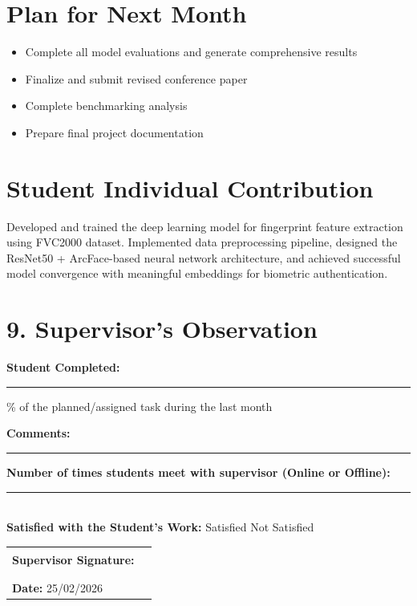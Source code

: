 \documentclass[12pt,a4paper]{article}
\begin{document}
\section{Plan for Next Month}
\begin{itemize}[leftmargin=*]
    \item Complete all model evaluations and generate comprehensive results
    \item Finalize and submit revised conference paper
    \item Complete benchmarking analysis
    \item Prepare final project documentation
\end{itemize}


\section{Student Individual Contribution}
Developed and trained the deep learning model for fingerprint feature extraction using FVC2000 dataset. Implemented data preprocessing pipeline, designed the ResNet50 + ArcFace-based neural network architecture, and achieved successful model convergence with meaningful embeddings for biometric authentication.

\section*{9. Supervisor's Observation}

\noindent\textbf{Student Completed:} \rule{3cm}{0.4pt}\% 
of the planned/assigned task during the last month

\vspace{0.5cm}

\noindent\textbf{Comments:}

\vspace{2cm}
\noindent\rule{\textwidth}{0.4pt}

\vspace{0.5cm}

\noindent\textbf{Number of times students meet with supervisor (Online or Offline):} \rule{1cm}{0.4pt} \\

\noindent\textbf{Satisfied with the Student's Work:} 
\hspace{0.5cm}  Satisfied 
\hspace{1cm}  Not Satisfied

\vspace{0.5cm}



\vspace{1.5cm}

\noindent\begin{tabular}{p{7cm} p{6cm}}
\textbf{Supervisor Signature:} & \rule{5cm}{0.4pt} \\
\\

\textbf{Date:} 25/02/2026
\end{tabular}

\vspace{0.8cm}
\end{document}
